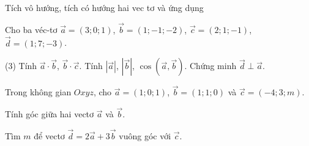 
\begin{dang}{Tích vô hướng, tích có hướng hai vec tơ và ứng dụng}
\end{dang}
\BTTL
\begin{vd}
	Cho ba véc-tơ $\vec{a} = (3; 0; 1)$, $\vec{b} = (1; -1; -2)$, $\vec{c} = (2; 1; -1)$, $\vec{d} = (1; 7; -3)$.
	\begin{tasks}(3)
		\task Tính $\vec{a}\cdot \vec{b}$, $\vec{b}\cdot \vec{c}$.
		\task Tính $\left| \vec{a} \right|$, $\left| \vec{b} \right|$, $\cos \left(\vec{a}, \vec{b}\right)$.
		\task Chứng minh $\vec{d} \perp \vec{a}$.
	\end{tasks}
\end{vd}
\begin{vd}
	Trong không gian $Oxyz$, cho $\vec{a}=(1;0;1)$, $\vec{b}=(1;1;0)$ và $\vec{c}=(-4;3;m)$.
	\begin{listEX}
		\item Tính góc giữa hai vectơ $\vec{a}$ và $\vec{b}$.
		\item Tìm $m$ để vectơ $\vec{d}=2\vec{a}+3\vec{b}$ vuông góc với $\vec{c}$.
	\end{listEX}
\end{vd}
